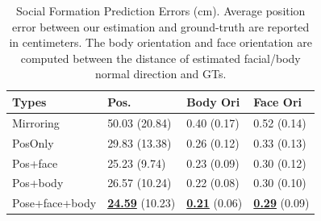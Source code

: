 \begin{table}[t]
	\centering
	\begin{tabular}{l| l| l| l}
		\hline
		Types & Pos. & Body Ori & Face Ori\\
		\hline
		Mirroring &  50.03 (20.84) & 0.40 (0.17) & 0.52 (0.14) \\
		\hline
		PosOnly & 29.83 (13.38) & 0.26 (0.12) & 0.33 (0.13) \\
		\hline
		Pos+face & 25.23 (9.74) & 0.23 (0.09) & 0.30 (0.12) \\
		\hline
		Pos+body & 26.57 (10.24) & 0.22 (0.08) & 0.30 (0.10) \\
		\hline
		Pose+face+body & \underline {\textbf{24.59}} (10.23) &  \underline {\textbf{0.21}} (0.06) &  \underline {\textbf{0.29}} (0.09) \\
		\hline
	\end{tabular}
	\caption{Social Formation Prediction Errors (cm). Average position error between our estimation and ground-truth are reported in centimeters. The body orientation and face orientation are computed between the distance of estimated facial/body normal direction and GTs.\label{table:predForm_errors}}
\end{table}










